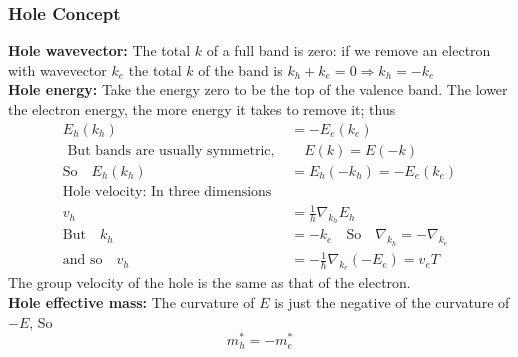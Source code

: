 \subsubsection{Hole Concept}
\textbf{Hole wavevector:} The total $k$ of a full band is zero: if we remove an electron with wavevector $k_{e}$ the total $k$ of the band is $k_{h}+k_{e}=0 \Rightarrow k_{h}=-k_{e}$\\
\textbf{Hole energy:} Take the energy zero to be the top of the valence band. The lower the electron energy, the more energy it takes to remove it; thus
\begin{align*}
E_{h}\left(k_{h}\right)&=-E_{e}\left(k_{e}\right)\\
\text { But bands are usually symmetric, }& \quad E(k)=E(-k)\\
\text{So}\quad E_{h}\left(k_{h}\right)&=E_{h}\left(-k_{h}\right)=-E_{e}\left(k_{e}\right)\\
\text{Hole velocity: In three dimensions}\\
v_{h}&=\frac{1}{h} \nabla_{k_{h}} E_{h}\\
\text{But}\quad k_{h}&=-k_{e} \quad\text{So}\quad \nabla_{k_{h}}=-\nabla_{k_{e}}\\
\text{and so}\quad v_{h}&=-\frac{1}{\hbar} \nabla_{k_{e}}\left(-E_{e}\right)=v_{e}
T\end{align*}
The group velocity of the hole is the same as that of the electron.\\
\textbf{Hole effective mass:} The curvature of $E$ is just the negative of the curvature of $-E$,
So
$$
m_{h}^{*}=-m_{e}^{*}
$$
